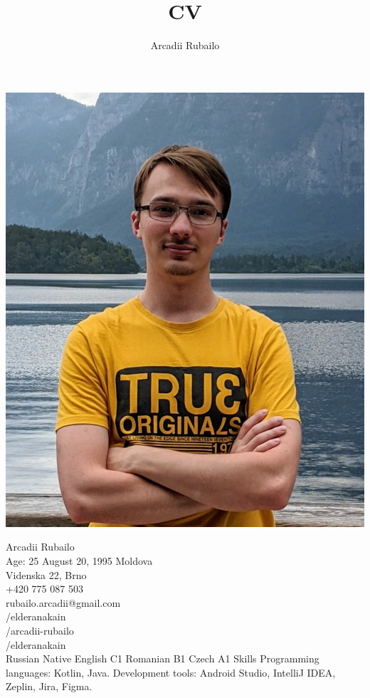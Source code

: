 \documentclass[12pt, a4paper]{article}
\title{CV}
\author{Arcadii Rubailo}
\begin{document}
\begin{minipage}{0.3\textwidth}
    \centering
    
    \includegraphics[width=\textwidth]{profile}
    
    Arcadii Rubailo \\
    Age: 25 August 20, 1995
    Moldova \\
    Videnska 22, Brno \\
    +420 775 087 503 \\
    rubailo.arcadii@gmail.com \\
    /elderanakain \\
    /arcadii-rubailo \\
    /elderanakain \\
    Russian Native
    English C1
    Romanian B1
    Czech A1
    Skills
    Programming languages:
    Kotlin, Java.
    Development tools:
    Android Studio, IntelliJ IDEA,
    Zeplin, Jira, Figma.

\end{minipage}
\hfill
\end{document}
